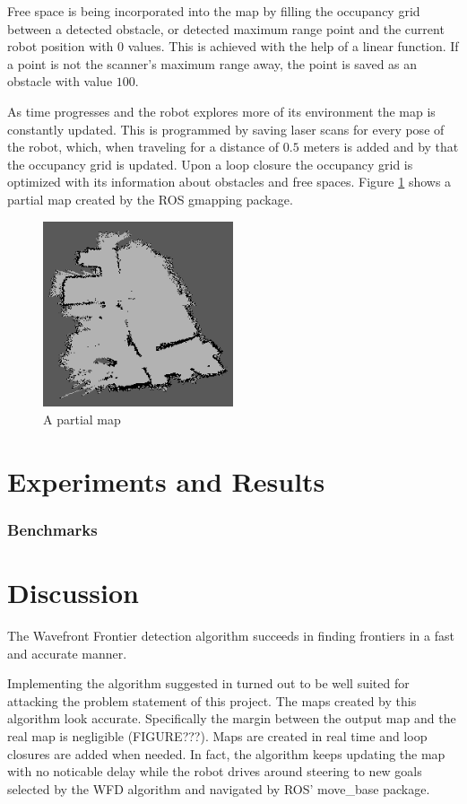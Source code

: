 \documentclass{ba-kecs}
\begin{document}
Free space is being incorporated into the map by filling the occupancy grid between a detected obstacle, or detected maximum range point and the current robot position with $0$ values. This is achieved with the help of a linear function. If a point is not the scanner's maximum range away, the point is saved as an obstacle with value $100$.

As time progresses and the robot explores more of its environment the map is constantly updated. This is programmed by saving laser scans for every pose of the robot, which, when traveling for a distance of $0.5$ meters is added and by that the occupancy grid is updated. Upon a loop closure the occupancy grid is optimized with its information about obstacles and free spaces.
Figure \ref{fig:random_map} shows a partial map created by the ROS gmapping package.
\begin{figure}[htbp]
	\centering
		\includegraphics[width=0.50\textwidth]{figures/random_map.png}
	\caption{A partial map}
	\label{fig:random_map}
\end{figure}

\section{Experiments and Results}
\label{sec:exp}
\subsubsection{Benchmarks}

\section{Discussion}
\label{sec:disc}
The Wavefront Frontier detection algorithm \citep{Keidar} succeeds in finding frontiers in a fast and accurate manner.

Implementing the algorithm suggested in \citep{Grisetti} turned out to be well suited for attacking the problem statement of this project. The maps created by this algorithm look accurate. Specifically the margin between the output map and the real map is negligible (FIGURE???). Maps are created in real time and loop closures are added when needed. In fact, the algorithm keeps updating the map with no noticable delay while the robot drives around steering to new goals selected by the WFD algorithm and navigated by ROS' move\_base package.
\end{document}
